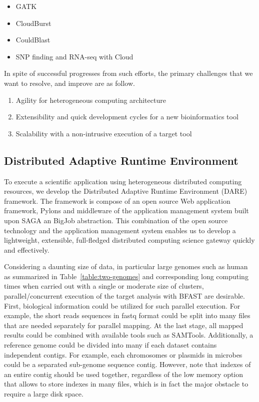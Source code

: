 \documentclass{acm_proc_article-sp}
\begin{document}
\begin{itemize}
\item GATK\cite{gatk}
\item CloudBurst\cite{cloudburst}
\item CouldBlast\cite{cloudblast}
\item SNP finding and RNA-seq with Cloud\cite{langmead2009, langmead2010}
\end{itemize}

In spite of successful progresses from such efforts, the primary challenges that we want to resolve, and improve are as follow.

\begin{enumerate}
\item Agility for heterogeneous computing architecture
\item Extensibility and quick development cycles for a new bioinformatics tool
\item Scalability with a non-intrusive execution of a target tool  
\end{enumerate}

\subsection{Distributed Adaptive Runtime Environment}

To execute a scientific application using heterogeneous distributed computing resources, we develop the Distributed Adaptive Runtime Environment (DARE) framework\cite{dareurl}.  The framework is compose of an open source Web application framework, Pylons
and middleware of the application management system built upon SAGA an BigJob abstraction\cite{saga-ccgrid10,saga-royalsoc,saga-web,jha2009developing,ecmls10}.  This combination of the open source technology and the application management system enables us to develop a lightweight, extensible, full-fledged distributed computing science gateway quickly and effectively\cite{pylonsurl}. 

Considering a daunting size of data, in particular large genomes such as human as summarized in Table~\ref{table:two-genomes} and corresponding long computing times when carried out with a single or moderate size of clusters, parallel/concurrent execution of the target analysis with BFAST are desirable.  First, biological information could be utilized for such parallel execution. For example, the short reads sequences in fastq format could be split into many files that are needed separately for parallel mapping.  At the last stage, all mapped results could be combined with available tools such as SAMTools\cite{samtools}.   Additionally, a reference genome could be divided into many if each dataset contains independent contigs.  For example, each chromosomes or plasmids in microbes could be a separated sub-genome sequence contig.  However, note that indexes of an entire contig should be used together, regardless of the low memory option that allows to store indexes in many files, which is in fact the major obstacle to require a large disk space.
\end{document}
